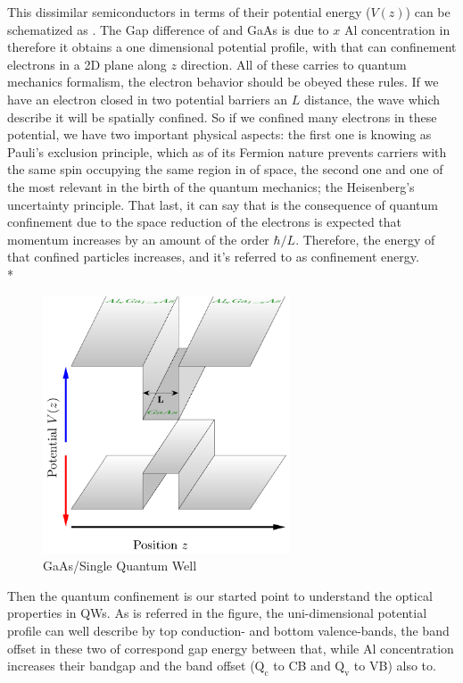 This dissimilar semiconductors in terms of their potential energy ($V(z)$) can be schematized as . The Gap difference of \algaas and GaAs is due to $x$ Al concentration in \algaas therefore it obtains a one dimensional potential profile, with that can confinement electrons in a 2D plane along $z$ direction. 
All of these carries to quantum mechanics formalism, the electron behavior should be obeyed these rules. If we have an electron closed in two potential barriers  an $L$ distance, the wave which describe it will be spatially confined.
So if we confined many electrons in these potential,  we have two important physical aspects: the first one is knowing as Pauli's exclusion principle, which as of its Fermion nature prevents carriers with the same spin occupying the same region in of space\cite{harrison2016quantum,pauli1925zusammenhang}, the second one and one of the most relevant in the birth of the quantum mechanics; the Heisenberg's uncertainty principle. 
That last, it can say  that is the consequence of quantum confinement due to the space reduction of the electrons is expected that momentum increases by an amount of the order $\hbar/L$. Therefore, the energy of that confined particles increases, and it's referred to as confinement energy\cite{cardona2005fundamentals}. \\*
\begin{figure}
	\centering
	\includegraphics[width=0.65\textwidth]{../figures/chapter-1/heterostructures/out/qw1}
	\caption{GaAs/\algaas Single Quantum Well }
	\label{fig:subsection-1.2-single-quantum-well-scheme}
\end{figure}
Then the quantum confinement is our started point to understand the optical properties in QWs. As is referred in the figure, the uni-dimensional potential profile can well describe by top conduction- and bottom valence-bands, the band offset in these two of correspond gap energy between that, while Al concentration increases their bandgap and the band offset ($\mathrm{Q_{c}}$ to CB and $\mathrm{Q_{v}}$ to VB) also to.   

